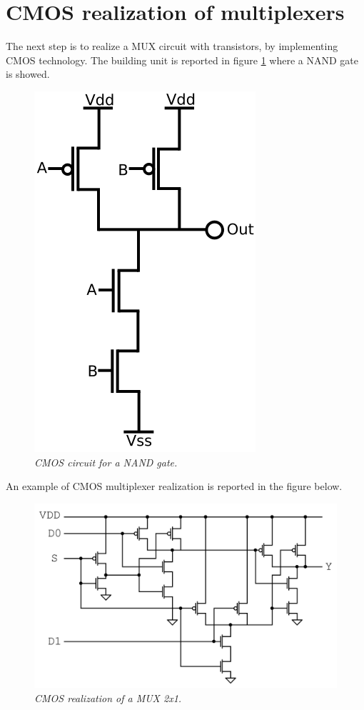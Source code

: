 \section{CMOS realization of multiplexers} 
The next step is to realize a MUX circuit with transistors, by implementing CMOS technology. The building unit is reported in figure \ref{nand2} where a NAND gate is showed.
\begin{figure}[!h]
	\centering
	\includegraphics[scale=0.3]{immagini/nand2.png}
	\caption{\textit{CMOS circuit for a NAND gate.}} 
	\label{nand2}
\end{figure}
\newline
An example of CMOS multiplexer realization is reported in the figure below.
\begin{figure}[!h]
	\centering
	\includegraphics[scale=0.4]{immagini/trans}
	\caption{\textit{CMOS realization of a MUX 2x1.}} 
	\label{mux_3}
\end{figure}



